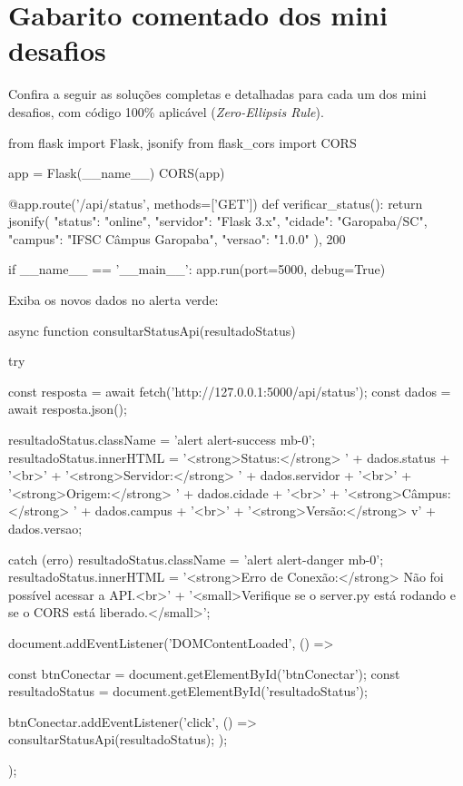 
\section{Gabarito comentado dos mini desafios}\label{sec:gabarito}

Confira a seguir as soluções completas e detalhadas para cada um dos mini desafios, com código 100\% aplicável (\textit{Zero-Ellipsis Rule}).

\begin{boxAtividade}
\end{boxAtividade}

\begin{boxCodigoPY}[]
from flask import Flask, jsonify
from flask_cors import CORS

app = Flask(__name__)
CORS(app)

@app.route('/api/status', methods=['GET'])
def verificar_status():
    return jsonify({
        "status": "online",
        "servidor": "Flask 3.x",
        "cidade": "Garopaba/SC",
        "campus": "IFSC Câmpus Garopaba",
        "versao": "1.0.0"
    }), 200

if __name__ == '__main__':
    app.run(port=5000, debug=True)
\end{boxCodigoPY}

Exiba os novos dados no alerta verde:
\begin{boxCodigoJS}
async function consultarStatusApi(resultadoStatus) {
  try {
    const resposta = await fetch('http://127.0.0.1:5000/api/status');
    const dados = await resposta.json();

    resultadoStatus.className = 'alert alert-success mb-0';
    resultadoStatus.innerHTML =
      '<strong>Status:</strong> ' + dados.status + '<br>' +
      '<strong>Servidor:</strong> ' + dados.servidor + '<br>' +
      '<strong>Origem:</strong> ' + dados.cidade + '<br>' +
      '<strong>Câmpus:</strong> ' + dados.campus + '<br>' +
      '<strong>Versão:</strong> v' + dados.versao;

  } catch (erro) {
    resultadoStatus.className = 'alert alert-danger mb-0';
    resultadoStatus.innerHTML =
      '<strong>Erro de Conexão:</strong> Não foi possível acessar a API.<br>' +
      '<small>Verifique se o server.py está rodando e se o CORS está liberado.</small>';
  }
}

document.addEventListener('DOMContentLoaded', () => {
  const btnConectar = document.getElementById('btnConectar');
  const resultadoStatus = document.getElementById('resultadoStatus');

  btnConectar.addEventListener('click', () => {
    consultarStatusApi(resultadoStatus);
  });
});
\end{boxCodigoJS}

